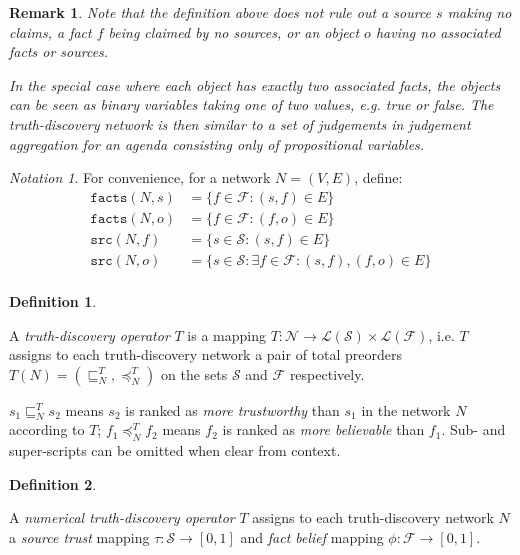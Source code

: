 \documentclass{article}
\theoremstyle{definition} \newtheorem{definition}{Definition}
\theoremstyle{definition} \newtheorem{example}{Example}
\theoremstyle{plain} \newtheorem{axiom}{Axiom}
\theoremstyle{plain} \newtheorem*{remark}{Remark}
\theoremstyle{remark} \newtheorem*{notation}{Notation}
\theoremstyle{plain} \newtheorem{lemma}{Lemma}
\theoremstyle{plain} \newtheorem{proposition}{Proposition}
\renewcommand{\S}{\mathcal{S}}  %
\newcommand{\F}{\mathcal{F}}
\newcommand{\N}{\mathcal{N}}
\newcommand{\sle}{\sqsubseteq}
\newcommand{\fle}{\preceq}
\newcommand{\src}{\texttt{src}}
\newcommand{\fact}{\texttt{facts}}
\newcommand{\orderings}{\mathcal{L}}
\begin{document}
\begin{remark}
Note that the definition above does not rule out a source $s$ making no claims,
a fact $f$ being claimed by no sources, or an object $o$ having no associated
facts or sources.

In the special case where each object has exactly two associated facts, the
objects can be seen as \emph{binary variables} taking one of two values, e.g.
true or false. The truth-discovery network is then similar to a set of
judgements in \emph{judgement aggregation}\cite{handbook_ja} for an agenda
consisting only of propositional variables.
\end{remark}

\begin{notation}
For convenience, for a network $N=(V, E)$, define:
\begin{align*}
    \fact(N, s) &= \{f \in \F : (s, f) \in E\} \\
    \fact(N, o) &= \{f \in \F : (f, o) \in E\} \\
    \src(N, f) &= \{s \in \S : (s, f) \in E\} \\
    \src(N, o) &= \{s \in \S : \exists f \in \F : (s, f), (f, o) \in E\} \\
\end{align*}
\end{notation}

\begin{definition}
\label{def:truth_discovery_operator}

A \emph{truth-discovery operator} $T$ is a mapping $T: \N \rightarrow
\orderings(\S) \times \orderings(\F)$, i.e. $T$ assigns to each truth-discovery
network a pair of total preorders $T(N) = (\sle_N^T, \fle_N^T)$ on the sets
$\S$ and $\F$ respectively.

$s_1 \sle_N^T s_2$ means $s_2$ is ranked as \emph{more trustworthy} than $s_1$
in the network $N$ according to $T$; $f_1 \fle_N^T f_2$ means $f_2$ is ranked
as \emph{more believable} than $f_1$. Sub- and super-scripts can be omitted
when clear from context.

\end{definition}

\begin{definition}
\label{def:numerical}

A \emph{numerical truth-discovery operator} $T$ assigns to each
truth-discovery network $N$ a \emph{source trust} mapping $\tau: \S \rightarrow
[0, 1]$ and \emph{fact belief} mapping $\phi: \F \rightarrow [0, 1]$.

\end{definition}
\end{document}

